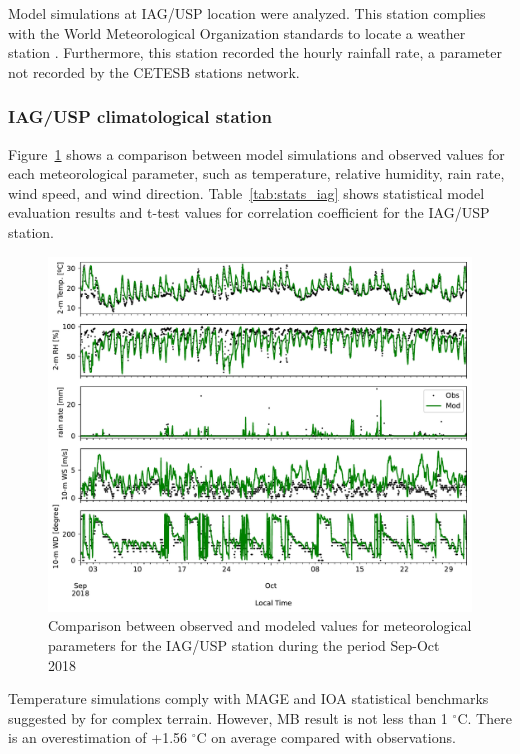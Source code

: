   Model simulations at IAG/USP location were analyzed. 
  This station complies with the World Meteorological Organization standards to locate a weather station \citep{WMO2018}.
  Furthermore, this station recorded the hourly rainfall rate, a parameter not recorded by the CETESB stations network.
  
  \subsubsection{IAG/USP climatological station}
Figure~\ref{fig:met_iag_comp} shows a comparison between model simulations and observed values for each meteorological parameter, such as temperature, relative humidity, rain rate, wind speed, and wind direction.
Table~\ref{tab:stats_iag} shows statistical model evaluation results and t-test values for correlation coefficient for the IAG/USP station.



\begin{figure}[!hbt]
  \includegraphics[width=1\textwidth]{fig/met_IAG_comparison}
  \caption{Comparison between observed and modeled values for meteorological parameters for the IAG/USP station during the period Sep-Oct 2018}
  \label{fig:met_iag_comp}
\end{figure}

Temperature simulations comply with MAGE and IOA statistical benchmarks suggested by \citet{Monk2019} for complex terrain.
However, MB result is not less than 1 $^{\circ}$C.
There is an overestimation of +1.56 $^{\circ}$C on average compared with observations.

